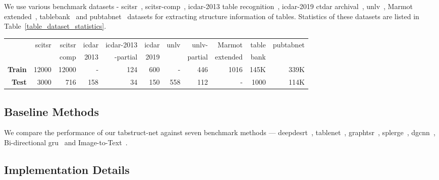 \documentclass[runningheads]{llncs}
\begin{document}
We use various benchmark datasets - {\sc s}ci{\sc tsr}~\cite{chi2019complicated}, {\sc s}ci{\sc tsr}-{\sc comp}~\cite{chi2019complicated}, {\sc icdar}-2013 table recognition~\cite{gobel2013icdar}, {\sc icdar}-2019 c{\sc td}a{\sc r} archival~\cite{gao2019icdar}, {\sc unlv}~\cite{shahab2010open}, Marmot extended~\cite{paliwal2019tablenet}, {\sc t}able{\sc b}ank~\cite{li2019tablebank} and {\sc p}ub{\sc t}ab{\sc n}et~\cite{zhong2019image} datasets for extracting structure information of tables. Statistics of these datasets are listed in Table~\ref{table_dataset_statistics}. 
\begin{table*}[ht!]
\begin{center}
\begin{tabular}{|r |r |r |r |r |r |r |r |r |r|r|} \hline
   &{\sc s}ci{\sc tsr} &{\sc s}ci{\sc tsr} &{\sc icdar} &{\sc icdar}-2013 &{\sc icdar} &{\sc unlv} &{\sc unlv-} &Marmot &{\sc t}able &{\sc p}ub{\sc t}ab{\sc n}et \\
   &   &{\sc comp} &2013  &-partial &2019 &  &partial &extended &{\sc b}ank  & \\ \hline
\textbf{Train} &12000 &12000 &-  &124 &600 &- &446 &1016 &145K &339K \\
\textbf{Test}  &3000  &716   &158 &34 &150 &558 &112 &- &1000 &114K \\ \hline
\end{tabular}
\end{center}
\caption{Statistics of the datasets used for our experiments.} \label{table_dataset_statistics}
\end{table*}

\subsection{Baseline Methods}

We compare the performance of our {\sc t}ab{\sc s}truct-{\sc n}et against seven benchmark methods --- {\sc d}eep{\sc d}e{\sc srt}~\cite{schreiber2017deepdesrt}, {\sc t}able{\sc n}et~\cite{paliwal2019tablenet}, {\sc g}raph{\sc tsr}~\cite{chi2019complicated}, {\sc splerge}~\cite{table_splitting}, {\sc dgcnn}~\cite{qasim2019rethinking}, Bi-directional {\sc gru}~\cite{Khan_2019} and Image-to-Text~\cite{li2019tablebank}.

\subsection{Implementation Details} \label{implementation_details}
\end{document}
